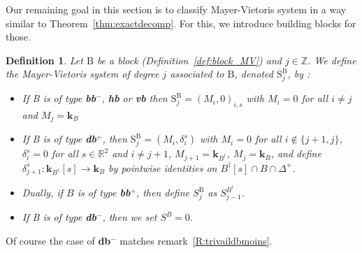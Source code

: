 \documentclass[a4paper, english, 11pt]{article}
\newcommand{\kk}[0]{\textbf{k}}
\newcommand{\0}{\vec{0}}
\newcommand{\R}[0]{\mathbb{R}}
\newcommand{\Z}[0]{\mathbb{Z}}
\newtheorem{defi}[prop]{Definition}
\begin{document}
Our remaining goal in this section is to classify Mayer-Vietoris system in a way similar to Theorem~\ref{thm:exactdecomp}. For this, we introduce building blocks for those.
\begin{defi}\label{D:blocksmodulesforMV}
Let $\text{B}$ be a block (Definition~\ref{def:block_MV}) and $j\in \Z$. We define the Mayer-Vietoris system of degree $j$ associated to $\text{B}$, denoted $\text{S}^\text{B}_j$,   by : 

\begin{itemize}
    \item If B is of type \textbf{bb}$^-$, \textbf{hb} or \textbf{vb} then $\text{S}^\text{B}_j = (M_i,0)_{i,s}$ with $M_i = 0$ for all $i\not = j$ and $M_j = \kk_B$
    
    \item If B is of type \textbf{db}$^+$, then $\text{S}^\text{B}_j = (M_i,\delta_i^s)$ with $M_i = 0$ for all $i\not \in \{j+1,j\} $, $\delta_i^s=0$ for all $s\in \R^2$ and $i\not = j+1$,  $M_{j+1} = \kk_{B^\dag}$, $M_{j}= \kk_{B}$, and define $\delta_{j+1}^s : \kk_{B^\dag}[s] \to \kk_B$ by pointwise identities on $B^\dag [s]\cap B \cap \Delta^+$.

    \item Dually, if $B$ is of type \textbf{bb$^+$}, then define $S^{\text{B}}_j$ as $S^{B^\dag}_{j-1}$.
    \item If B is of type \textbf{db}$^{-}$, then we set $S^B=0$.
\end{itemize}  
\end{defi}
Of course the case of \textbf{db}$^{-}$ matches remark~\ref{R:trivaildbmoins}.
\end{document}
